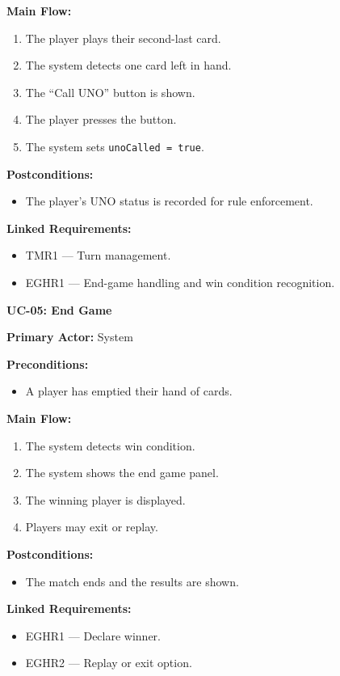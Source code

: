 \documentclass[12pt]{article}
\begin{document}
\textbf{Main Flow:}
\begin{enumerate}
    \item The player plays their second-last card.
    \item The system detects one card left in hand.
    \item The “Call UNO” button is shown.
    \item The player presses the button.
    \item The system sets \texttt{unoCalled = true}.
\end{enumerate}

\textbf{Postconditions:}
\begin{itemize}
    \item The player's UNO status is recorded for rule enforcement.
\end{itemize}

\textbf{Linked Requirements:}
\begin{itemize}
    \item TMR1 — Turn management.
    \item EGHR1 — End-game handling and win condition recognition.
\end{itemize}

\vspace{0.5cm}

\textbf{UC-05: End Game}

\textbf{Primary Actor:} System

\textbf{Preconditions:}
\begin{itemize}
    \item A player has emptied their hand of cards.
\end{itemize}

\textbf{Main Flow:}
\begin{enumerate}
    \item The system detects win condition.
    \item The system shows the end game panel.
    \item The winning player is displayed.
    \item Players may exit or replay.
\end{enumerate}

\textbf{Postconditions:}
\begin{itemize}
    \item The match ends and the results are shown.
\end{itemize}

\textbf{Linked Requirements:}
\begin{itemize}
    \item EGHR1 — Declare winner.
    \item EGHR2 — Replay or exit option.
\end{itemize}
\end{document}
